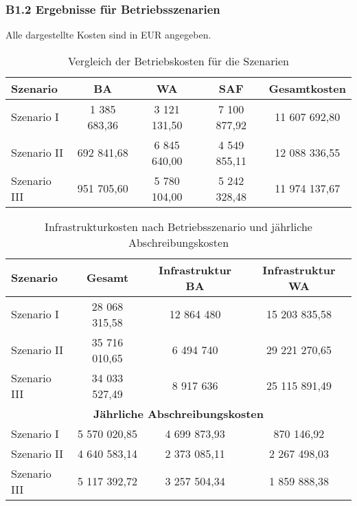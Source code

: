 \subsubsection{B1.2 Ergebnisse für Betriebsszenarien}
Alle dargestellte Kosten sind in EUR angegeben.
\begin{table}[h]
    \centering
    \caption{Vergleich der Betriebskosten für die Szenarien}
    \begin{tabular}{lcccc}
        \toprule
        \textbf{Szenario} & \textbf{BA} & \textbf{WA} & \textbf{SAF} & \textbf{Gesamtkosten} \\
        \midrule
        Szenario I   & 1 385 683,36  & 3 121 131,50  & 7 100 877,92  & 11 607 692,80 \\
        Szenario II  & 692 841,68    & 6 845 640,00  & 4 549 855,11  & 12 088 336,55 \\
        Szenario III & 951 705,60    & 5 780 104,00  & 5 242 328,48  & 11 974 137,67 \\
        \bottomrule
    \end{tabular}
    \label{tab:betriebsszenarien}
\end{table}

\begin{table}[h]
   \centering
    \caption{Infrastrukturkosten nach Betriebsszenario und jährliche Abschreibungskosten}
    \begin{tabular}{lccc}
        \toprule
        \textbf{Szenario} & \textbf{Gesamt} & \textbf{Infrastruktur BA} & \textbf{Infrastruktur WA} \\
        \midrule
        Szenario I   & 28 068 315,58 & 12 864 480  & 15 203 835,58 \\
        Szenario II  & 35 716 010,65 & 6 494 740   & 29 221 270,65 \\
        Szenario III & 34 033 527,49 & 8 917 636   & 25 115 891,49 \\
        \midrule
        \multicolumn{4}{c}{\textbf{Jährliche Abschreibungskosten}} \\
        \midrule
        Szenario I   & 5 570 020,85  & 4 699 873,93  & 870 146,92  \\
        Szenario II  & 4 640 583,14  & 2 373 085,11  & 2 267 498,03 \\
        Szenario III & 5 117 392,72  & 3 257 504,34  & 1 859 888,38 \\
        \bottomrule
    \end{tabular}
    \label{tab:szenario_analyse}
\end{table}
